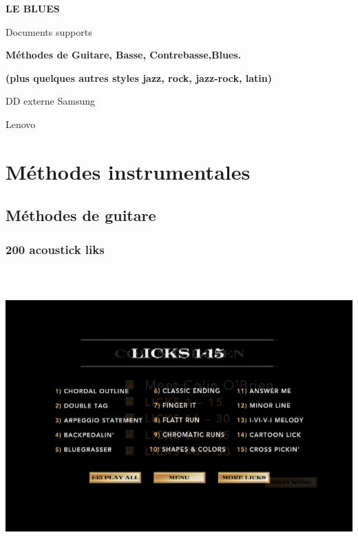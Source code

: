 \documentclass[a4paper]{book}
\title{}
\author{}
\date{2018-07-26T17:55:01.714755971}
\begin{document}
\clearpage\setcounter{page}{1}\pagestyle{LeftPage}
\thispagestyle{RightPage}

{\centering\sffamily\bfseries
LE BLUES \par
Documents supports
\par}

{\centering\sffamily\bfseries
M\'ethodes de Guitare, Basse, Contrebasse,Blues.
\par}


{\centering\sffamily\bfseries
(plus quelques autres styles jazz, rock, jazz-rock, latin)
\par}

{\centering
DD externe Samsung
\par}

{\centering
Lenovo
\par}

\setcounter{tocdepth}{10}
\renewcommand\contentsname{Table des mati\`eres}
\tableofcontents



\clearpage

\part{Méthodes instrumentales}
\chapter{Méthodes de guitare}




\clearpage\section[200 acoustick
liks]{200 acoustick liks}
\hypertarget{RefHeadingToc102973218262}{}

\begin{center}
\includegraphics[width=17cm,height=11.333cm]{lebluessupportsmethodes-img1.png}
\end{center}
\end{document}

